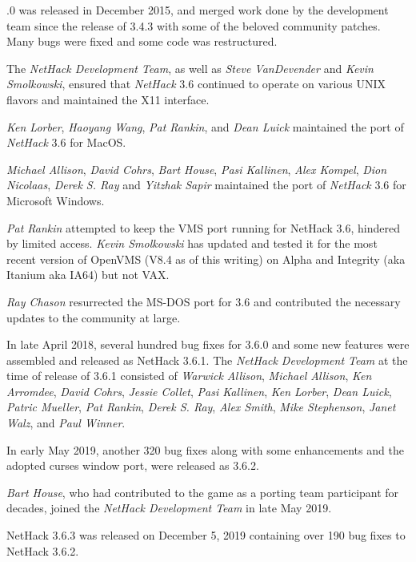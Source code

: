 \documentclass[titlepage]{article}
\begin{document}
.0 was released in December 2015, and merged work done by the development
team since the release of 3.4.3 with some of the beloved community
patches.  Many bugs were fixed and some code was restructured.

\medskip
The \textit{NetHack Development Team}, as well as \textit{Steve VanDevender} and
\textit{Kevin Smolkowski}, ensured that \textit{NetHack} 3.6 continued to
operate on various UNIX flavors and maintained the X11 interface.

\medskip
\textit{Ken Lorber}, \textit{Haoyang Wang}, \textit{Pat Rankin}, and \textit{Dean Luick}
maintained the port of \textit{NetHack} 3.6 for MacOS.

\medskip
\textit{Michael Allison}, \textit{David Cohrs}, \textit{Bart House},
\textit{Pasi Kallinen}, \textit{Alex Kompel}, \textit{Dion Nicolaas},
\textit{Derek S. Ray} and  \textit{Yitzhak Sapir}
maintained the port of  \textit{NetHack} 3.6 for Microsoft Windows.

\medskip
\textit{Pat Rankin} attempted to keep the VMS port running for NetHack 3.6,
hindered by limited access.  \textit{Kevin Smolkowski} has updated and tested it
for the most recent version of OpenVMS (V8.4 as of this writing) on Alpha
and Integrity (aka Itanium aka IA64) but not VAX.

\medskip
\textit{Ray Chason}  resurrected the MS-DOS port for 3.6 and contributed the
necessary updates to the community at large.

\medskip
In late April 2018, several hundred bug fixes for 3.6.0 and some new features
were assembled and released as NetHack 3.6.1.
The \textit{NetHack Development Team} at the
time of release of 3.6.1 consisted of
\textit{Warwick Allison}, \textit{Michael Allison}, \textit{Ken Arromdee},
\textit{David Cohrs}, \textit{Jessie Collet},
\textit{Pasi Kallinen}, \textit{Ken Lorber}, \textit{Dean Luick},
\textit{Patric Mueller}, \textit{Pat Rankin}, \textit{Derek S. Ray},
\textit{Alex Smith}, \textit{Mike Stephenson}, \textit{Janet Walz}, and
\textit{Paul Winner}.

\medskip
In early May 2019, another 320 bug fixes along with some enhancements and
the adopted curses window port, were released as 3.6.2.

\medskip
\textit{Bart House}, who had contributed to the game as a porting team participant
for decades, joined the \textit{NetHack Development Team} in late May 2019.

\medskip
NetHack 3.6.3 was released on December 5, 2019 containing over 190 bug
fixes to NetHack 3.6.2.
\end{document}
